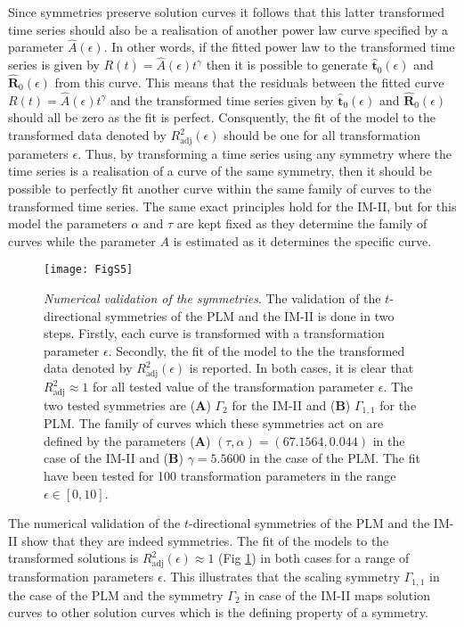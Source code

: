 Since symmetries preserve solution curves it follows that this latter transformed time series should also be a realisation of another power law curve specified by a parameter $\hat{A}(\epsilon)$. In other words, if the fitted power law to the transformed time series is given by $R(t)=\hat{A}(\epsilon)t^{\gamma}$ then it is possible to generate $\mathbf{\hat{t}}_0(\epsilon)$ and $\mathbf{\hat{R}}_0(\epsilon)$ from this curve. This means that the residuals between the fitted curve $R(t)=\hat{A}(\epsilon)t^{\gamma}$ and the transformed time series given by $\mathbf{\hat{t}}_0(\epsilon)$ and $\mathbf{\hat{R}}_0(\epsilon)$ should all be zero as the fit is perfect. Consquently, the fit of the model to the transformed data denoted by $R^2_{\mathrm{adj}}(\epsilon)$ should be one for all transformation parameters $\epsilon$. Thus, by transforming a time series using any symmetry where the time series is a realisation of a curve of the same symmetry, then it should be possible to perfectly fit another curve within the same family of curves to the transformed time series. The same exact principles hold for the IM-II, but for this model the parameters $\alpha$ and $\tau$ are kept fixed as they determine the family of curves while the parameter $A$ is estimated as it determines the specific curve.

   





\begin{figure}[htbp!]
  \texttt{[image: FigS5]}
  \caption[Numerical validation of the symmetries]{\textit{Numerical validation of the symmetries}. The validation of the $t$-directional symmetries of the PLM and the IM-II is done in two steps. Firstly, each curve is transformed with a transformation parameter $\epsilon$. Secondly, the fit of the model to the the transformed data denoted by $R^2_{\mathrm{adj}}(\epsilon)$ is reported. In both cases, it is clear that $R^2_{\mathrm{adj}}\approx 1$ for all tested value of the transformation parameter $\epsilon$. The two tested symmetries are (\textbf{A}) $\Gamma_2$ for the IM-II and (\textbf{B}) $\Gamma_{1,1}$ for the PLM. The family of curves which these symmetries act on are defined by the parameters (\textbf{A}) $(\tau,\alpha)=(67.1564,0.044)$ in the case of the IM-II and (\textbf{B}) $\gamma=5.5600$ in the case of the PLM. The fit have been tested for 100 transformation parameters in the range $\epsilon\in [0,10]$. } 
  \label{fig:numerical_validation}
  \end{figure}



  The numerical validation of the $t$-directional symmetries of the PLM and the IM-II show that they are indeed symmetries. The fit of the models to the transformed solutions is $R^{2}_{\mathrm{adj}}(\epsilon)\approx 1$ (Fig \ref{fig:numerical_validation}) in both cases for a range of transformation parameters $\epsilon$. This illustrates that the scaling symmetry $\Gamma_{1,1}$ in the case of the PLM and the symmetry $\Gamma_{2}$ in case of the IM-II maps solution curves to other solution curves which is the defining property of a symmetry. 
